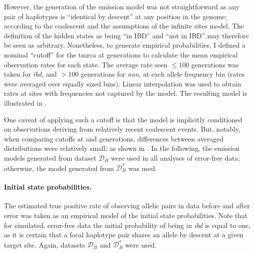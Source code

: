 However, the generation of the emission model was not straightforward as any pair of haplotypes is
“identical by descent” at any position in the genome; according to the coalescent and the assumptions of the infinite sites model.
The definition of the hidden states as being ``in IBD'' and ``not in IBD'' may therefore be seen as arbitrary.
Nonetheless, to generate empirical probabilities,
I defined a nominal ``cutoff'' for the \gls{tmrca} at  generations to calculate the mean empirical observation rates for each state.
The average rate seen ${\leq 100}$ generations was taken for \emph{ibd}, and
$>100$ generations for \emph{non}, at each allele frequency bin (rates were averaged over  equally sized bins).
Linear interpolation was used to obtain rates at sites with frequencies not captured by the model.
The resulting model is illustrated in .

%

%

One caveat of applying such a cutoff is that the model is implicitly conditioned on observations deriving from relatively recent coalescent events.
But, notably, when comparing cutoffs at  and  generations, differences between averaged distributions were relatively small; as shown in .
In the following, the emission models generated from dataset $\mathcal{D}_B$ were used in all analyses of error-free data; otherwise, the model generated from $\mathcal{D}_B^{\ast}$ was used.



\paragraph{Initial state probabilities.}
The estimated true positive rate of observing allelic pairs in data before and after error was taken as an empirical model of the initial state probabilities.
Note that for simulated, error-free data the initial probability of being in \emph{ibd} is equal to one, as it is certain that a focal haplotype pair shares an allele by descent at a given target site.
Again, datasets $\mathcal{D}_B$ and $\mathcal{D}_B^{\ast}$ were used.

%

%

